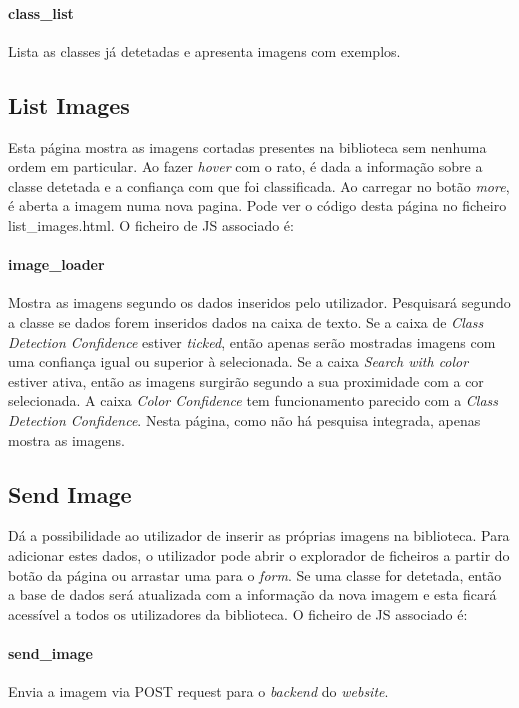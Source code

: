 \documentclass{report}
\begin{document}
\paragraph{class\_list} 
Lista as classes já detetadas e apresenta imagens com exemplos.

\subsection{List Images}
\label{listimages}
Esta página mostra as imagens cortadas presentes na biblioteca sem nenhuma ordem em particular. Ao fazer \textit{hover} com o rato, é dada a informação sobre a classe detetada e a confiança com que foi classificada. Ao carregar no botão \textit{more}, é aberta a imagem numa nova pagina. Pode ver o código desta página no ficheiro list\_images.html. O ficheiro de \ac{JS} associado é:
\paragraph{image\_loader}
Mostra as imagens segundo os dados inseridos pelo utilizador. Pesquisará segundo a classe se dados forem inseridos dados na caixa de texto. Se a caixa de \textit{Class Detection Confidence} estiver \textit{ticked}, então apenas serão mostradas imagens com uma confiança igual ou superior à selecionada. Se a caixa \textit{Search with color} estiver ativa, então as imagens surgirão segundo a sua proximidade com a cor selecionada. A caixa \textit{Color Confidence} tem funcionamento parecido com a \textit{Class Detection Confidence}. Nesta página, como não há pesquisa integrada, apenas mostra as imagens.


\subsection{Send Image}
Dá a possibilidade ao utilizador de inserir as próprias imagens na biblioteca. Para adicionar estes dados, o utilizador pode abrir o explorador de ficheiros a partir do botão da página ou arrastar uma para o \textit{form}. Se uma classe for detetada, então a base de dados será atualizada com a informação da nova imagem e esta ficará acessível a todos os utilizadores da biblioteca. O ficheiro de \ac{JS} associado é:
\paragraph{send\_image}
Envia a imagem via POST request para o \textit{backend} do \textit{website}.
\end{document}
